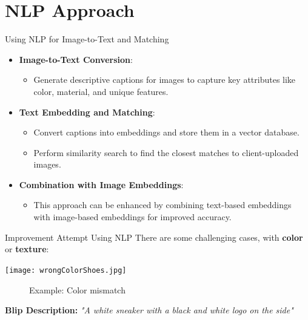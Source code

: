 \documentclass{beamer}
\begin{document}
\section{NLP Approach}
    \begin{frame}{Using NLP for Image-to-Text and Matching}
    \begin{itemize}
        \item \textbf{Image-to-Text Conversion}:
        \begin{itemize}
            \item Generate descriptive captions for images to capture key attributes like color, material, and unique features.
        \end{itemize}
        \item \textbf{Text Embedding and Matching}:
        \begin{itemize}
            \item Convert captions into embeddings and store them in a vector database.
            \item Perform similarity search to find the closest matches to client-uploaded images.
        \end{itemize}
        \item \textbf{Combination with Image Embeddings}:
        \begin{itemize}
            \item This approach can be enhanced by combining text-based embeddings with image-based embeddings for improved accuracy.
        \end{itemize}
    \end{itemize}
\end{frame}

\begin{frame}{Improvement Attempt Using NLP}
    There are some challenging cases, with \textbf{color} or \textbf{texture}:
    \vspace{0.5cm} %

    \centering
    \begin{minipage}{0.5\textwidth}
        \centering
        \texttt{[image: wrongColorShoes.jpg]}
    \begin{figure}[h]
        \caption{Example: Color mismatch}
    \end{figure}
    \end{minipage}
    \hfill
    \begin{minipage}{0.45\textwidth}
        \raggedright
        \textbf{Blip Description:}
        \vspace{0.3cm} %
        \textit{"A white sneaker with a black and white logo on the side"}
    \end{minipage}
\end{frame}
\end{document}
